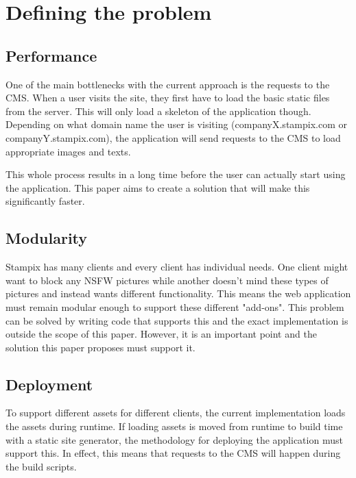 
\chapter{Defining the problem} %

\label{Chapter2} 


\section{Performance}

One of the main bottlenecks with the current approach is the requests to the CMS. When a user visits the site, they first have to load the basic static files from the server. 
This will only load a skeleton of the application though. Depending on what domain name the user is visiting (companyX.stampix.com or companyY.stampix.com), the application will send requests to the CMS to load appropriate images and texts.

This whole process results in a long time before the user can actually start using the application. This paper aims to create a solution that will make this significantly faster.

\section{Modularity}

Stampix has many clients and every client has individual needs. One client might want to block any NSFW pictures while another doesn't mind these types of pictures and instead wants different functionality.
This means the web application must remain modular enough to support these different "add-ons". This problem can be solved by writing code that supports this and the exact implementation is outside the scope of this paper. 
However, it is an important point and the solution this paper proposes must support it.

\section{Deployment}

To support different assets for different clients, the current implementation loads the assets during runtime. 
If loading assets is moved from runtime to build time with a static site generator, the methodology for deploying the application must support this. 
In effect, this means that requests to the CMS will happen during the build scripts.